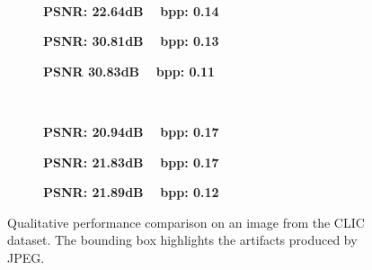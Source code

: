 \begin{figure}[t]
    \captionsetup[subfigure]{aboveskip=-1pt,belowskip=2pt}
	\centering
	\begin{subfigure}{.25\textwidth}
		\centering
		\caption*{\tiny \ }
	\end{subfigure}%
	\begin{subfigure}{.25\textwidth}
		\centering
		\caption*{\tiny \textbf{PSNR: 22.64dB ~ bpp: 0.14}}
	\end{subfigure}%
	\begin{subfigure}{.25\textwidth}
		\centering
		\caption*{\tiny \textbf{PSNR: 30.81dB ~ bpp: 0.13}}
	\end{subfigure}%
	\begin{subfigure}{.25\textwidth}
		\centering
		\caption*{\tiny \textbf{PSNR 30.83dB ~ bpp: 0.11}}
	\end{subfigure}  

	\begin{subfigure}{.25\textwidth}
		\centering
		\caption*{\tiny \ }
	\end{subfigure}%
	\begin{subfigure}{.25\textwidth}
		\centering
        \caption*{\tiny \textbf{PSNR: 20.94dB ~ bpp: 0.17}}
	\end{subfigure}%
	\begin{subfigure}{.25\textwidth}
		\centering
		\caption*{\tiny \textbf{PSNR: 21.83dB ~ bpp: 0.17}}
	\end{subfigure}%
	\begin{subfigure}{.25\textwidth}
		\centering
		\caption*{\tiny \textbf{PSNR: 21.89dB ~ bpp: 0.12}}
	\end{subfigure}
	\caption{Qualitative performance comparison on an image from the CLIC dataset. The bounding box highlights the artifacts produced by JPEG.}
	\label{fig:qualitative_comparison}
\end{figure}


